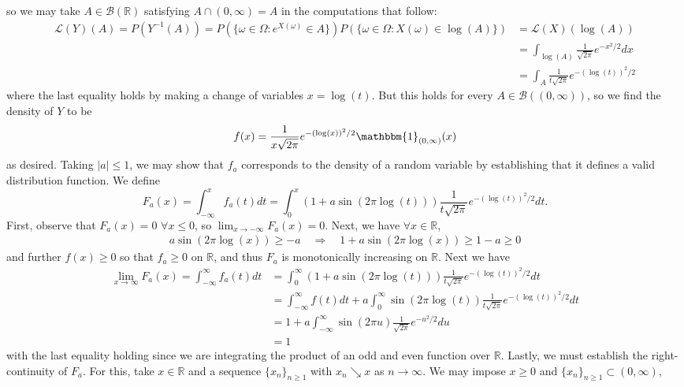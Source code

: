 \documentclass[10pt]{article}
\newcommand{\mbb}[1]{\mathbb{#1}}
\newcommand{\1}[1]{\mathbbm{1}_{#1}}
\newcommand{\mc}[1]{\mathcal{#1}}
\begin{document}
    so we may take $A\in\mc{B}(\mbb{R})$ satisfying $A\cap(0,\infty)=A$ in the computations that follow:
    \begin{align*}
        \mc{L}(Y)(A)=P(Y^{-1}(A))=P(\{\omega\in\Omega:e^{X(\omega)}\in A\})P(\{\omega\in\Omega:X(\omega)\in\log(A)\})&=\mc{L}(X)(\log(A))\\
        &=\int_{\log(A)}\frac{1}{\sqrt{2\pi}}e^{-x^2/2}dx\\
        &=\int_A\frac{1}{t\sqrt{2\pi}}e^{-(\log(t))^2/2}
    \end{align*}
    where the last equality holds by making a change of variables $x=\log(t)$. But this holds for every $A\in\mc{B}((0,\infty))$, so we find the density of $Y$ to be
    \begin{align*}
        f(x)=\frac{1}{x\sqrt{2\pi}}e^{-(\log(x))^2/2}\1{(0,\infty)}(x)
    \end{align*}
    as desired. Taking $|a|\leq1$, we may show that $f_a$ corresponds to the density of a random variable by establishing that it defines a valid distribution function. We define
    \[F_a(x)=\int_{-\infty}^xf_a(t)dt=\int_{0}^x(1+a\sin(2\pi\log(t)))\frac{1}{t\sqrt{2\pi}}e^{-(\log(t))^2/2}dt.\] 
    First, observe that $F_a(x)=0$ $\forall x\leq 0$, so $\lim_{x\rightarrow-\infty}F_a(x)=0$. Next, we have $\forall x\in\mbb{R}$,
    \begin{align*}
        a\sin(2\pi\log(x))\geq -a\quad\Rightarrow\quad 1+a\sin(2\pi\log(x))\geq 1-a\geq 0
    \end{align*}
    and further $f(x)\geq 0$ so that $f_a\geq 0$ on $\mbb{R}$, and thus $F_a$ is monotonically increasing on $\mbb{R}$. Next we have
    \begin{align*}
        \lim_{x\rightarrow\infty}F_a(x)=\int_{-\infty}^\infty f_a(t)dt&=\int_0^\infty(1+a\sin(2\pi\log(t)))\frac{1}{t\sqrt{2\pi}}e^{-(\log(t))^2/2}dt\\
        &=\int_{-\infty}^\infty f(t)dt+a\int_{0}^\infty \sin(2\pi\log(t))\frac{1}{t\sqrt{2\pi}}e^{-(\log(t))^2/2}dt\\
        &=1+a\int_{-\infty}^\infty\sin(2\pi u)\frac{1}{\sqrt{2\pi}}e^{-u^2/2}du\tag{setting $u=\log(t)$}\\
        &=1
    \end{align*}
    with the last equality holding since we are integrating the product of an odd and even function over $\mbb{R}$. Lastly, we must establish the right-continuity of $F_a$. For this, take $x\in\mbb{R}$ and a sequence $\{x_n\}_{n\geq 1}$ with $x_n\searrow x$ as $n\rightarrow\infty$. We may impose $x\geq0$ and $\{x_n\}_{n\geq 1}\subset(0,\infty)$,
\end{document}
